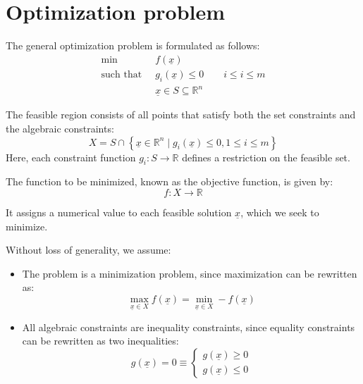 \section{Optimization problem}

The general optimization problem is formulated as follows:
\begin{align*}
    \min                      \:&\: f(\underline{x})        \\
    \text{such that }           &\: g_i(\underline{x})\leq 0 \qquad i\leq i \leq m \\
                                &\: \underline{x}\in S \subseteq \mathbb{R}^n
\end{align*}
\begin{definition}
    The feasible region consists of all points that satisfy both the set constraints and the algebraic constraints:
    \[X=S\cap\left\{\underline{x}\in\mathbb{R}^n\mid g_i(\underline{x})\leq 0,1 \leq i \leq m\right\}\]
    Here, each constraint function $g_i:S\rightarrow\mathbb{R}$ defines a restriction on the feasible set.
\end{definition}
\begin{definition}
    The function to be minimized, known as the objective function, is given by:
    \[f:X\rightarrow\mathbb{R}\]
\end{definition}
\noindent It assigns a numerical value to each feasible solution $\underline{x}$, which we seek to minimize.

Without loss of generality, we assume:
\begin{itemize} 
    \item The problem is a minimization problem, since maximization can be rewritten as:
        \[\max_{\underline{x}\in X}f(\underline{x})=\min_{\underline{x}\in X}-f(\underline{x})\]
    \item All algebraic constraints are inequality constraints, since equality constraints can be rewritten as two inequalities:
        \[g(\underline{x})=0 \equiv \begin{cases} g(\underline{x})\geq 0 \\ g(\underline{x})\leq 0\end{cases}\]
\end{itemize} 

